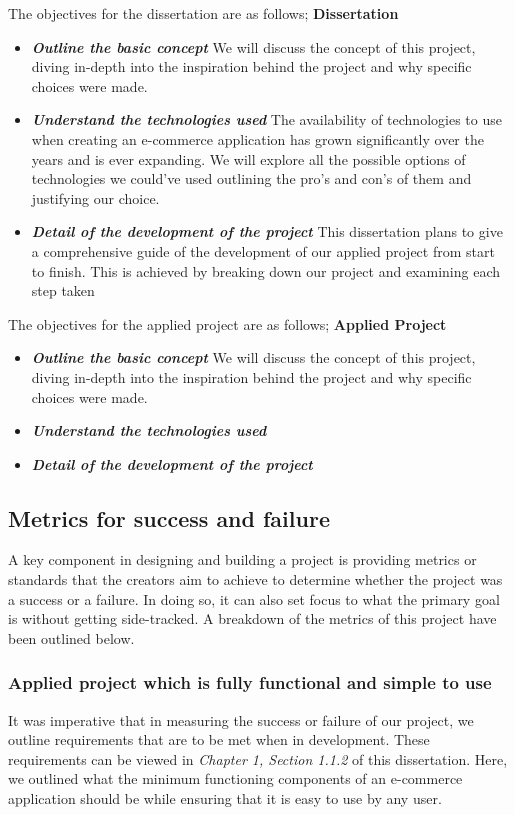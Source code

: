 The objectives for the dissertation are as follows;
\newline
\newline
\textbf{Dissertation}
\begin{itemize}
  \item \textbf{\textit{Outline the basic concept}} We will discuss the concept of this project, diving in-depth into the inspiration behind the project and why specific choices were made.
  \item \textbf{\textit{Understand the technologies used}} The availability of technologies to use when creating an e-commerce application has grown significantly over the years and is ever expanding. We will explore all the possible options of technologies we could've used outlining the pro's and con's of them and justifying our choice.
  \item \textbf{\textit{Detail of the development of the project}} This dissertation plans to give a comprehensive guide of the development of our applied project from start to finish. This is achieved by breaking down our project and examining each step taken
\end{itemize}
The objectives for the applied project are as follows;
\newline
\newline
\textbf{Applied Project}
\begin{itemize}
  \item \textbf{\textit{Outline the basic concept}} We will discuss the concept of this project, diving in-depth into the inspiration behind the project and why specific choices were made.
  \item \textbf{\textit{Understand the technologies used}}
  \item \textbf{\textit{Detail of the development of the project}}
\end{itemize}

\subsection{Metrics for success and failure}
A key component in designing and building a project is providing metrics or standards that the creators aim to achieve to determine whether the project was a success or a failure. In doing so, it can also set focus to what the primary goal is without getting side-tracked. A breakdown of the metrics of this project have been outlined below.

\subsubsection{Applied project which is fully functional and simple to use}
It was imperative that in measuring the success or failure of our project, we outline requirements that are to be met when in development. These requirements can be viewed in \textit{Chapter 1, Section 1.1.2} of this dissertation. Here, we outlined what the minimum functioning components of an e-commerce application should be while ensuring that it is easy to use by any user.

